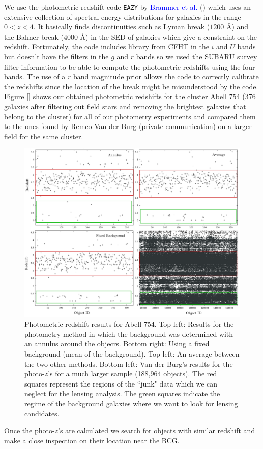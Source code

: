 We use the photometric redshift code \texttt{EAZY}  by \textcolor{blue}{Brammer et al.} (\citeyear{Reference22}) which uses an extensive collection of spectral energy distributions for galaxies in the range $0<z<4$. It basically finds discontinuities such as Lyman break ($1200$ \AA) and the Balmer break ($4000$ \AA) in the SED of galaxies which give a constraint on the redshift. Fortunately, the code includes library from CFHT in the $i$ and $U$ bands but doesn't have the filters in the $g$ and $r$ bands so we used the SUBARU survey filter information to be able to compute the photometric redshifts using the four bands. The use of a $r$ band magnitude prior allows the code to correctly calibrate the redshifts since the location of the break might be misunderstood by the code. Figure [] shows our obtained photometric redshifts for the cluster Abell 754 (376 galaxies after filtering out field stars and removing the brightest galaxies that belong to the cluster) for all of our photometry experiments and compared them to the ones found by Remco Van der Burg (private communication) on a larger field for the same cluster. 

\begin{figure}[H]
\centering
\includegraphics[width=15cm]{images/photo_z_red_squares.png}
\caption[Photometric redshift results for Abell 754]{Photometric redshift results for Abell 754. Top left: Results for the photometry method in which the background was determined with an annulus around the objecrs. Bottom right: Using a fixed background (mean of the background). Top left: An average between the two other methods. Bottom left: Van der Burg's results for the photo-$z$'s for a much larger sample (188,964 objects). The red squares represent the regions of the ``junk" data which we can neglect for the lensing analysis. The green squares indicate the regime of the background galaxies where we want to look for lensing candidates.}
\end{figure}

Once the photo-$z$'s are calculated we search for objects with similar redshift and make a close inspection on their location near the BCG. 